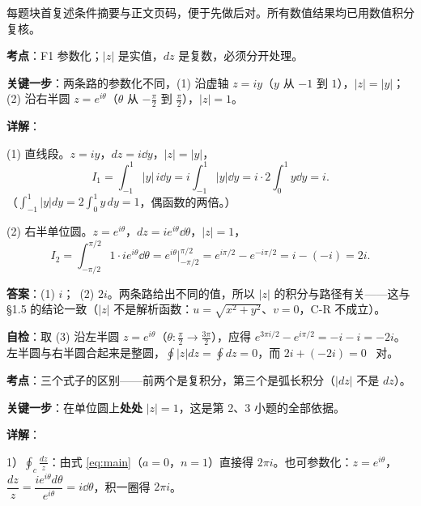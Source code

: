 \documentclass[11pt]{ctexart}
\let\origsubhdr\subhdr
\renewcommand{\subhdr}[1]{\par\needspace{4\baselineskip}\origsubhdr{#1}}
\let\orighdr\hdr
\renewcommand{\hdr}[2]{\par\needspace{9\baselineskip}\orighdr{#1}{#2}}
\renewcommand{\qbreak}{\needspace{0.45\textheight}}
\begin{document}
\flowerrule


每题块首复述条件摘要与正文页码，便于先做后对。所有数值结果均已用数值积分复核。

\qbreak
{}
\label{app:hw1}

\textbf{考点}：F1 参数化；$|z|$ 是实值，$dz$ 是复数，必须分开处理。

\textbf{关键一步}：两条路的参数化不同，(1) 沿虚轴 $z=iy$（$y$ 从 $-1$ 到 $1$），$|z|=|y|$；(2) 沿右半圆 $z=e^{i\theta}$（$\theta$ 从 $-\tfrac{\pi}{2}$ 到 $\tfrac{\pi}{2}$），$|z|=1$。

\textbf{详解}：

(1) 直线段。$z=iy$，$dz=i\dd y$，$|z|=|y|$，
\[ I_1=\int_{-1}^{1}|y|\,i\dd y=i\int_{-1}^{1}|y|\dd y=i\cdot2\int_0^1 y\dd y=i . \]
（$\int_{-1}^1|y|dy=2\int_0^1y\,dy=1$，偶函数的两倍。）

(2) 右半单位圆。$z=e^{i\theta}$，$dz=ie^{i\theta}\dd\theta$，$|z|=1$，
\[ I_2=\int_{-\pi/2}^{\pi/2}1\cdot ie^{i\theta}\dd\theta=e^{i\theta}\Big|_{-\pi/2}^{\pi/2}=e^{i\pi/2}-e^{-i\pi/2}=i-(-i)=2i . \]

\textbf{答案}：(1) $i$；\ (2) $2i$。两条路给出不同的值，所以 $|z|$ 的积分与路径有关——这与 §1.5 的结论一致（$|z|$ 不是解析函数：$u=\sqrt{x^{2}+y^{2}}$、$v=0$，C-R 不成立）。

\textbf{自检}：取 (3) 沿左半圆 $z=e^{i\theta}$（$\theta:\tfrac{\pi}{2}\to\tfrac{3\pi}{2}$），应得 $e^{3\pi i/2}-e^{i\pi/2}=-i-i=-2i$。左半圆与右半圆合起来是整圆，$\oint|z|dz=\oint dz=0$，而 $2i+(-2i)=0$ \ 对。

\qbreak
{}
\label{app:hw2}

\textbf{考点}：三个式子的区别——前两个是复积分，第三个是弧长积分（$|dz|$ 不是 $dz$）。

\textbf{关键一步}：在单位圆上\textbf{处处} $|z|=1$，这是第 2、3 小题的全部依据。

\textbf{详解}：

1）$\displaystyle\oint_c\frac{dz}{z}$：由式 \eqref{eq:main}（$a=0$，$n=1$）直接得 $2\pi i$。也可参数化：$z=e^{i\theta}$，$\dfrac{dz}{z}=\dfrac{ie^{i\theta}d\theta}{e^{i\theta}}=i\dd\theta$，积一圈得 $2\pi i$。
\end{document}
